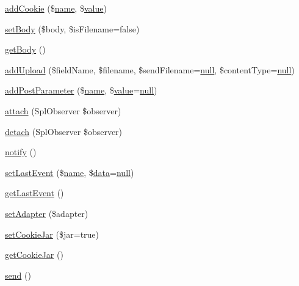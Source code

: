 \begin{DoxyCompactItemize}
\hyperlink{classHTTP__Request2_aeb8d7d755804ae328a7941be4d56aff7}{add\+Cookie} (\$\hyperlink{common_8js_a22c29d2aa8ed6161ce8faa718ef76e68}{name}, \$\hyperlink{jquery_8js_abe5393d870043cf6aaa1d5ad5fce755c}{value})
\item 
\hyperlink{classHTTP__Request2_acff40db54d3829648859a2832f93a004}{set\+Body} (\$body, \$is\+Filename=false)
\item 
\hyperlink{classHTTP__Request2_a206f758763ed28dce4341babf5c932d0}{get\+Body} ()
\item 
\hyperlink{classHTTP__Request2_ac8e89d3a20ba389c4781f1e5adf58e04}{add\+Upload} (\$field\+Name, \$filename, \$send\+Filename=\hyperlink{modernizr_8min_8js_a286f9ec831c5e676eeb493248eab9575}{null}, \$content\+Type=\hyperlink{modernizr_8min_8js_a286f9ec831c5e676eeb493248eab9575}{null})
\item 
\hyperlink{classHTTP__Request2_a45a950fb625fe85fedd123fc95cff92d}{add\+Post\+Parameter} (\$\hyperlink{common_8js_a22c29d2aa8ed6161ce8faa718ef76e68}{name}, \$\hyperlink{jquery_8js_abe5393d870043cf6aaa1d5ad5fce755c}{value}=\hyperlink{modernizr_8min_8js_a286f9ec831c5e676eeb493248eab9575}{null})
\item 
\hyperlink{classHTTP__Request2_a91ff31f582d0156df454685e60b72e1c}{attach} (Spl\+Observer \$observer)
\item 
\hyperlink{classHTTP__Request2_a43da613f3526bfe033f5fafd58f9c50c}{detach} (Spl\+Observer \$observer)
\item 
\hyperlink{classHTTP__Request2_af35a8a6eb99219760dddd6223599a8ef}{notify} ()
\item 
\hyperlink{classHTTP__Request2_a1c05aea3c3857ad8f4c6a0a9eb33911d}{set\+Last\+Event} (\$\hyperlink{common_8js_a22c29d2aa8ed6161ce8faa718ef76e68}{name}, \$\hyperlink{document__category_8js_a94b4f25375ac17cb917012e05bf514a7}{data}=\hyperlink{modernizr_8min_8js_a286f9ec831c5e676eeb493248eab9575}{null})
\item 
\hyperlink{classHTTP__Request2_afe70adf8c72a426f80ce66b4170e0f61}{get\+Last\+Event} ()
\item 
\hyperlink{classHTTP__Request2_a27fadfa673c3317675ab78b5df99264a}{set\+Adapter} (\$adapter)
\item 
\hyperlink{classHTTP__Request2_a396fdfdb92d2cb5dce1c8230919eb5d4}{set\+Cookie\+Jar} (\$jar=true)
\item 
\hyperlink{classHTTP__Request2_ad56d5f45235cb4f753d1ee9c7cd4c0e0}{get\+Cookie\+Jar} ()
\item 
\hyperlink{classHTTP__Request2_a0c8dee043682c61c0f1dc1558ea64d36}{send} ()
\end{DoxyCompactItemize}
